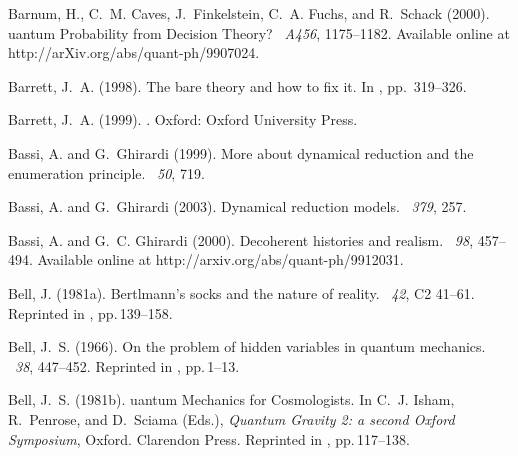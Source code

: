 \documentclass[12pt]{article}
\begin{document}
\begin{thebibliography}{}
Barnum, H., C.~M. Caves, J.~Finkelstein, C.~A. Fuchs, and R.~Schack (2000).
uantum {P}robability from {D}ecision {T}heory?
~{\em A456},
  1175--1182.
\newblock Available online at http://arXiv.org/abs/quant-ph/9907024.

Barrett, J.~A. (1998).
\newblock The bare theory and how to fix it.
\newblock In , pp.\  319--326.

Barrett, J.~A. (1999).
.
\newblock Oxford: Oxford University Press.

Bassi, A. and G.~Ghirardi (1999).
\newblock More about dynamical reduction and the enumeration principle.
~{\em 50}, 719.

Bassi, A. and G.~Ghirardi (2003).
\newblock Dynamical reduction models.
~{\em 379}, 257.

Bassi, A. and G.~C. Ghirardi (2000).
\newblock Decoherent histories and realism.
~{\em 98}, 457--494.
\newblock Available online at http://arxiv.org/abs/quant-ph/9912031.

Bell, J. (1981a).
\newblock Bertlmann's socks and the nature of reality.
~{\em 42}, C2 41--61.
\newblock Reprinted in , pp.\,139--158.

Bell, J.~S. (1966).
\newblock On the problem of hidden variables in quantum mechanics.
~{\em 38}, 447--452.
\newblock Reprinted in , pp.\,1--13.

Bell, J.~S. (1981b).
uantum {M}echanics for {C}osmologists.
\newblock In C.~J. Isham, R.~Penrose, and D.~Sciama (Eds.), {\em Quantum
  Gravity 2: a second {O}xford Symposium}, Oxford. Clarendon Press.
\newblock Reprinted in , pp.\,117--138.


\end{thebibliography}
\end{document}
